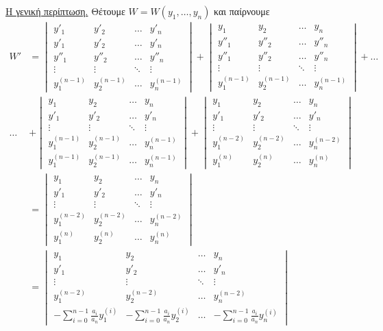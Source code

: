 \documentclass[11pt,a4paper,twoside]{book}
\begin{document}
\underline{Η γενική περίπτωση.} Θέτουμε $W = W(y_1, \dots, y_n)$ και παίρνουμε
\begin{align*}
W' &= 
\begin{vmatrix}
y'_1 & y'_2 & \dots & y'_n \\
y'_1 & y'_2 & \dots & y'_n \\
y''_1 & y''_2 & \dots & y''_n \\
\vdots & \vdots & \ddots & \vdots \\
y_1^{(n-1)} & y_2^{(n-1)} & \dots & y_n^{(n-1)}
\end{vmatrix}
+
\begin{vmatrix}
y_1 & y_2 & \dots & y_n \\
y''_1 & y''_2 & \dots & y''_n \\
y''_1 & y''_2 & \dots & y''_n \\
\vdots & \vdots & \ddots & \vdots \\
y_1^{(n-1)} & y_2^{(n-1)} & \dots & y_n^{(n-1)}
\end{vmatrix}
+ \dots \\
\dots &+
\begin{vmatrix}
y_1 & y_2 & \dots & y_n \\
y'_1 & y'_2 & \dots & y'_n \\
\vdots & \vdots & \ddots & \vdots \\
y_1^{(n-1)} & y_2^{(n-1)} & \dots & y_n^{(n-1)} \\
y_1^{(n-1)} & y_2^{(n-1)} & \dots & y_n^{(n-1)}
\end{vmatrix}
+
\begin{vmatrix}
y_1 & y_2 & \dots & y_n \\
y'_1 & y'_2 & \dots & y'_n \\
\vdots & \vdots & \ddots & \vdots \\
y_1^{(n-2)} & y_2^{(n-2)} & \dots & y_n^{(n-2)} \\
y_1^{(n)} & y_2^{(n)} & \dots & y_n^{(n)}
\end{vmatrix}
\\
&=
\begin{vmatrix}
y_1 & y_2 & \dots & y_n \\
y'_1 & y'_2 & \dots & y'_n \\
\vdots & \vdots & \ddots & \vdots \\
y_1^{(n-2)} & y_2^{(n-2)} & \dots & y_n^{(n-2)} \\
y_1^{(n)} & y_2^{(n)} & \dots & y_n^{(n)}
\end{vmatrix}
\\
&=
\begin{vmatrix}
y_1 & y_2 & \dots & y_n \\
y'_1 & y'_2 & \dots & y'_n \\
\vdots & \vdots & \ddots & \vdots \\
y_1^{(n-2)} & y_2^{(n-2)} & \dots & y_n^{(n-2)} \\
-\sum_{i=0}^{n-1} \frac{a_i}{a_n} y_1^{(i)} & -\sum_{i=0}^{n-1} \frac{a_i}{a_n} y_2^{(i)} & \dots & -\sum_{i=0}^{n-1} \frac{a_i}{a_n} y_n^{(i)}
\end{vmatrix}
\end{align*}
\end{document}
